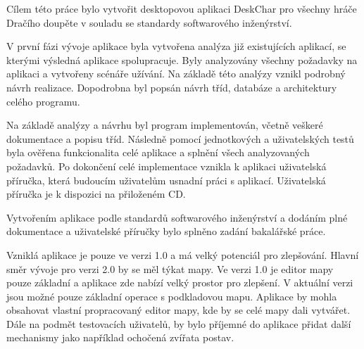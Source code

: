 \documentclass[thesis=B,czech]{resources/FITthesis}[2012/06/26]
\begin{document}
\begin{conclusion}
Cílem této práce bylo vytvořit desktopovou aplikaci DeskChar pro všechny hráče Dračího doupěte v souladu se standardy softwarového inženýrství. \par

V první fázi vývoje aplikace byla vytvořena analýza již existujících aplikací, se kterými výsledná aplikace spolupracuje. Byly analyzovány všechny požadavky na aplikaci a vytvořeny scénáře užívání. Na základě této analýzy vznikl podrobný návrh realizace. Dopodrobna byl popsán návrh tříd, databáze a architektury celého programu. \par

Na základě analýzy a návrhu byl program implementován, včetně veškeré dokumentace a popisu tříd. Následně pomocí jednotkových a uživatelských testů byla ověřena funkcionalita celé aplikace a splnění všech analyzovaných požadavků. Po dokončení celé implementace vznikla k aplikaci uživatelská příručka, která budoucím uživatelům usnadní práci s aplikací. Uživatelská příručka je k dispozici na přiloženém CD. \par

Vytvořením aplikace podle standardů softwarového inženýrství a dodáním plné dokumentace a uživatelské příručky bylo splněno zadání bakalářské práce. \par

Vzniklá aplikace je pouze ve verzi 1.0 a má velký potenciál pro zlepšování. Hlavní směr vývoje pro verzi 2.0 by se měl týkat mapy. Ve verzi 1.0 je editor mapy pouze základní a aplikace zde nabízí velký prostor pro zlepšení. V aktuální verzi jsou možné pouze základní operace s podkladovou mapu. Aplikace by mohla obsahovat vlastní propracovaný editor mapy, kde by se celé mapy dali vytvářet. Dále na podmět testovacích uživatelů, by bylo příjemné do aplikace přidat další mechanismy jako například ochočená zvířata postav.

\end{conclusion}




\appendix
\end{document}
